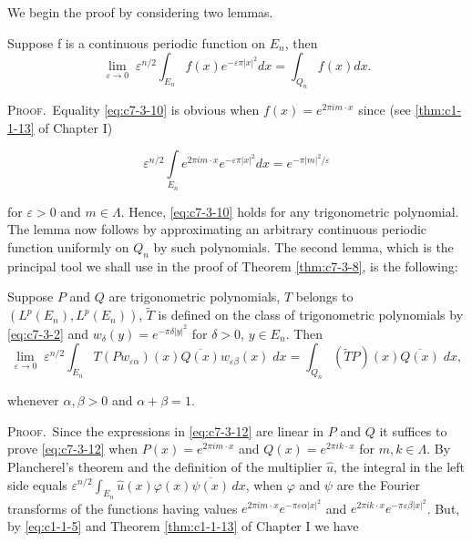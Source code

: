 We begin the proof by considering two lemmas.

\begin{lemma}
\label{lem:c7-3-9}
Suppose f is a continuous periodic function on $E_{n}$, then
\begin{equation}\label{eq:c7-3-10}
\lim_{\varepsilon\to0}\;\varepsilon^{n/2}\int_{E_{n}}f(x)e^{-\varepsilon\pi|x|^{2}}d x=\int_{Q_{n}}f(x)d x.
\end{equation}

\end{lemma}

\textsc{Proof.}\ Equality \eqref{eq:c7-3-10} is obvious when $f(x) = e^{2\pi im \cdot x}$ since (see \eqref{thm:c1-1-13} of Chapter I)

\[
\varepsilon^{n/2}\int\limits_{E_{n}}e^{2\pi i m\cdot x}e^{-\varepsilon\pi|x|^{2}}d x=e^{-\pi|m|^{2}/\varepsilon}
\]

for $\varepsilon > 0$ and $m \in \Lambda$. Hence, \eqref{eq:c7-3-10} holds for any trigonometric polynomial. The lemma now follows by approximating an arbitrary continuous periodic function uniformly on $Q_n$ by such polynomials. The second lemma, which is the principal tool we shall use in the proof of Theorem \ref{thm:c7-3-8}, is the following:

\begin{lemma}
\label{lem:c7-3-11}
Suppose $P$ and $Q$ are trigonometric polynomials, $T$ belongs to $(L^p(E_n), L^p(E_n))$, $\tilde{T}$ is defined on the class of trigonometric polynomials by \eqref{eq:c7-3-2} and $w_\delta(y) = e^{-\pi\delta|y|^2}$ for $\delta > 0$, $y \in E_n$. Then
\begin{equation}\label{eq:c7-3-12}
\lim_{\varepsilon\to0}\;\varepsilon^{n/2}\int_{E_{n}}T(P w_{\varepsilon\alpha})(x)\overline{{Q(x)}}w_{\varepsilon\beta}(x)\;d x=\int_{Q_{n}}(\tilde{T}P)(x)\overline{{Q(x)}}\;d x,
\end{equation}

whenever $\alpha, \beta > 0$ and $\alpha + \beta = 1$.
\end{lemma}

\textsc{Proof.}\ Since the expressions in \eqref{eq:c7-3-12} are linear in $P$ and $Q$ it suffices to prove \eqref{eq:c7-3-12} when $P(x) = e^{2\pi i m \cdot x}$ and $Q(x) = e^{2\pi i k \cdot x}$ for $m, k \in \Lambda$. By Plancherel's theorem and the definition of the multiplier $\hat{u}$, the integral in the left side equals $\varepsilon^{n/2} \int_{E_n} \hat{u}(x) \varphi(x) \overline{\psi(x)} \, dx$, when $\varphi$ and $\psi$ are the Fourier transforms of the functions having values $e^{2\pi i m \cdot x} e^{-\pi\varepsilon\alpha |x|^2}$ and $e^{2\pi i k \cdot x} e^{-\pi\varepsilon\beta |x|^2}$. But, by \eqref{eq:c1-1-5} and Theorem \ref{thm:c1-1-13} of Chapter I we have

